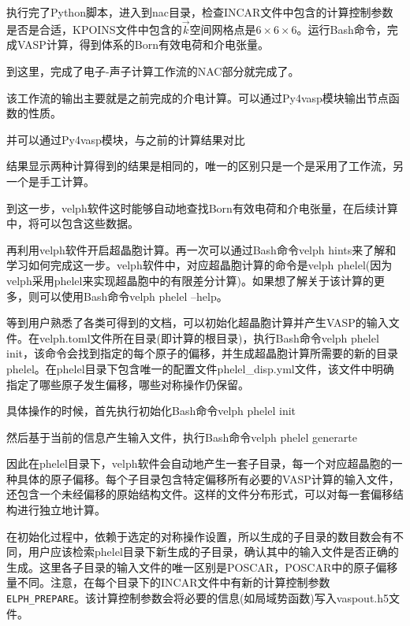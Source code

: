 {

执行完了\textrm{Python}脚本，进入到\textrm{nac}目录，检查\textrm{INCAR}文件中包含的计算控制参数是否是合适，\textrm{KPOINS}文件中包含的$\vec k$空间网格点是$6\times6\times6$。运行\textrm{Bash}命令，完成\textrm{VASP}计算，得到体系的\textrm{Born}有效电荷和介电张量。

到这里，完成了电子-声子计算工作流的\textrm{NAC}部分就完成了。

该工作流的输出主要就是之前完成的介电计算。可以通过\textrm{Py4vasp}模块输出节点函数的性质。

并可以通过\textrm{Py4vasp}模块，与之前的计算结果对比

结果显示两种计算得到的结果是相同的，唯一的区别只是一个是采用了工作流，另一个是手工计算。

到这一步，\textrm{velph}软件这时能够自动地查找\textrm{Born}有效电荷和介电张量，在后续计算中，将可以包含这些数据。

再利用\textrm{velph}软件开启超晶胞计算。再一次可以通过\textrm{Bash}命令\textrm{velph hints}来了解和学习如何完成这一步。\textrm{velph}软件中，对应超晶胞计算的命令是\textrm{velph phelel}(因为\textrm{velph}采用\textrm{phelel}来实现超晶胞中的有限差分计算)。如果想了解关于该计算的更多，则可以使用\textrm{Bash}命令\textrm{velph phelel --help}。

等到用户熟悉了各类可得到的文档，可以初始化超晶胞计算并产生\textrm{VASP}的输入文件。在\textrm{velph.toml}文件所在目录(即计算的根目录)，执行\textrm{Bash}命令\textrm{velph phelel init}，该命令会找到指定的每个原子的偏移，并生成超晶胞计算所需要的新的目录\textrm{phelel}。在\textrm{phelel}目录下包含唯一的配置文件\textrm{phelel\_disp.yml}文件，该文件中明确指定了哪些原子发生偏移，哪些对称操作仍保留。

具体操作的时候，首先执行初始化\textrm{Bash}命令\textrm{velph phelel init}

然后基于当前的信息产生输入文件，执行\textrm{Bash}命令\textrm{velph phelel generarte}

因此在\textrm{phelel}目录下，\textrm{velph}软件会自动地产生一套子目录，每一个对应超晶胞的一种具体的原子偏移。每个子目录包含特定偏移所有必要的\textrm{VASP}计算的输入文件，还包含一个未经偏移的原始结构文件。这样的文件分布形式，可以对每一套偏移结构进行独立地计算。

在初始化过程中，依赖于选定的对称操作设置，所以生成的子目录的数目数会有不同，用户应该检索\textrm{phelel}目录下新生成的子目录，确认其中的输入文件是否正确的生成。这里各子目录的输入文件的唯一区别是\textrm{POSCAR}，\textrm{POSCAR}中的原子偏移量不同。注意，在每个目录下的\textrm{INCAR}文件中有新的计算控制参数\texttt{ELPH\_PREPARE}。该计算控制参数会将必要的信息(如局域势函数)写入\textrm{vaspout.h5}文件。

}
